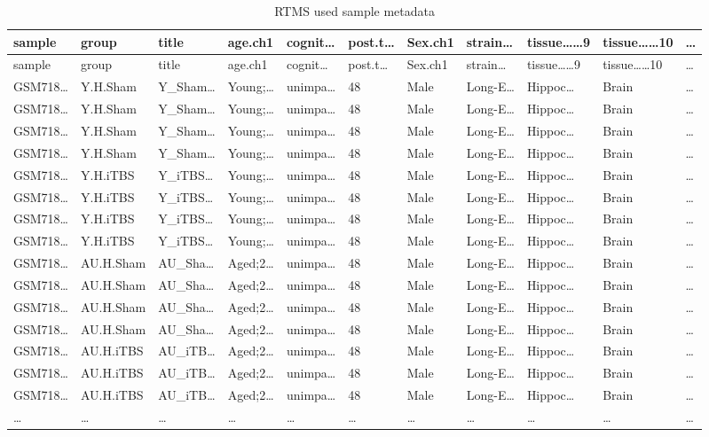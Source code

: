 \documentclass[
]{article}
\begin{document}
\begin{longtable}[]{@{}lllllllllll@{}}
\caption{\label{tab:rTMS-used-sample-metadata}RTMS used sample metadata}\tabularnewline
\toprule
sample & group & title & age.ch1 & cognit\ldots{} & post.t\ldots{} & Sex.ch1 & strain\ldots{} & tissue\ldots\ldots9 & tissue\ldots\ldots10 & \ldots{}\tabularnewline
\midrule
\endfirsthead
\toprule
sample & group & title & age.ch1 & cognit\ldots{} & post.t\ldots{} & Sex.ch1 & strain\ldots{} & tissue\ldots\ldots9 & tissue\ldots\ldots10 & \ldots{}\tabularnewline
\midrule
\endhead
GSM718\ldots{} & Y.H.Sham & Y\_Sham\ldots{} & Young;\ldots{} & unimpa\ldots{} & 48 & Male & Long-E\ldots{} & Hippoc\ldots{} & Brain & \ldots{}\tabularnewline
GSM718\ldots{} & Y.H.Sham & Y\_Sham\ldots{} & Young;\ldots{} & unimpa\ldots{} & 48 & Male & Long-E\ldots{} & Hippoc\ldots{} & Brain & \ldots{}\tabularnewline
GSM718\ldots{} & Y.H.Sham & Y\_Sham\ldots{} & Young;\ldots{} & unimpa\ldots{} & 48 & Male & Long-E\ldots{} & Hippoc\ldots{} & Brain & \ldots{}\tabularnewline
GSM718\ldots{} & Y.H.Sham & Y\_Sham\ldots{} & Young;\ldots{} & unimpa\ldots{} & 48 & Male & Long-E\ldots{} & Hippoc\ldots{} & Brain & \ldots{}\tabularnewline
GSM718\ldots{} & Y.H.iTBS & Y\_iTBS\ldots{} & Young;\ldots{} & unimpa\ldots{} & 48 & Male & Long-E\ldots{} & Hippoc\ldots{} & Brain & \ldots{}\tabularnewline
GSM718\ldots{} & Y.H.iTBS & Y\_iTBS\ldots{} & Young;\ldots{} & unimpa\ldots{} & 48 & Male & Long-E\ldots{} & Hippoc\ldots{} & Brain & \ldots{}\tabularnewline
GSM718\ldots{} & Y.H.iTBS & Y\_iTBS\ldots{} & Young;\ldots{} & unimpa\ldots{} & 48 & Male & Long-E\ldots{} & Hippoc\ldots{} & Brain & \ldots{}\tabularnewline
GSM718\ldots{} & Y.H.iTBS & Y\_iTBS\ldots{} & Young;\ldots{} & unimpa\ldots{} & 48 & Male & Long-E\ldots{} & Hippoc\ldots{} & Brain & \ldots{}\tabularnewline
GSM718\ldots{} & AU.H.Sham & AU\_Sha\ldots{} & Aged;2\ldots{} & unimpa\ldots{} & 48 & Male & Long-E\ldots{} & Hippoc\ldots{} & Brain & \ldots{}\tabularnewline
GSM718\ldots{} & AU.H.Sham & AU\_Sha\ldots{} & Aged;2\ldots{} & unimpa\ldots{} & 48 & Male & Long-E\ldots{} & Hippoc\ldots{} & Brain & \ldots{}\tabularnewline
GSM718\ldots{} & AU.H.Sham & AU\_Sha\ldots{} & Aged;2\ldots{} & unimpa\ldots{} & 48 & Male & Long-E\ldots{} & Hippoc\ldots{} & Brain & \ldots{}\tabularnewline
GSM718\ldots{} & AU.H.Sham & AU\_Sha\ldots{} & Aged;2\ldots{} & unimpa\ldots{} & 48 & Male & Long-E\ldots{} & Hippoc\ldots{} & Brain & \ldots{}\tabularnewline
GSM718\ldots{} & AU.H.iTBS & AU\_iTB\ldots{} & Aged;2\ldots{} & unimpa\ldots{} & 48 & Male & Long-E\ldots{} & Hippoc\ldots{} & Brain & \ldots{}\tabularnewline
GSM718\ldots{} & AU.H.iTBS & AU\_iTB\ldots{} & Aged;2\ldots{} & unimpa\ldots{} & 48 & Male & Long-E\ldots{} & Hippoc\ldots{} & Brain & \ldots{}\tabularnewline
GSM718\ldots{} & AU.H.iTBS & AU\_iTB\ldots{} & Aged;2\ldots{} & unimpa\ldots{} & 48 & Male & Long-E\ldots{} & Hippoc\ldots{} & Brain & \ldots{}\tabularnewline
\ldots{} & \ldots{} & \ldots{} & \ldots{} & \ldots{} & \ldots{} & \ldots{} & \ldots{} & \ldots{} & \ldots{} & \ldots{}\tabularnewline
\bottomrule
\end{longtable}
\end{document}

